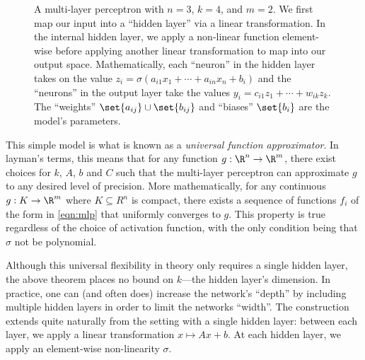 \begin{figure}
	\centering

	\caption{A multi-layer perceptron with $n = 3$, $k = 4$, and $m = 2$.  We first map our input into a ``hidden layer'' via a linear transformation. In the internal hidden layer, we apply a non-linear function element-wise before applying another linear transformation to map into our output space. Mathematically, each ``neuron'' in the hidden layer takes on the value $z_i = \sigma(a_{i1} x_1 + \cdots + a_{in} x_n + b_i)$ and the ``neurons'' in the output layer take the values $y_i = c_{i1} z_1 + \cdots + w_{ik} z_k$. The ``weights'' $\set{a_{ij}} \cup \set{b_{ij}}$ and ``biases'' $\set{b_i}$ are the model's parameters.}
	\label{fig:mlp-diagram}
\end{figure}

This simple model is what is known as a \emph{universal function approximator}. In layman's terms, this means that for any function $g : \R^n \to \R^m$, there exist choices for $k$, $A$, $b$ and $C$ such that the multi-layer perceptron can approximate $g$ to any desired level of precision. More mathematically, for any continuous $g : K \to \R^m$ where $K \subseteq R^n$ is compact, there exists a sequence of functions $f_i$ of the form in \autoref{eqn:mlp} that uniformly converges to $g$. This property is true regardless of the choice of activation function, with the only condition being that $\sigma$ not be polynomial.

Although this universal flexibility in theory only requires a single hidden layer, the above theorem places no bound on $k$---the hidden layer's dimension. In practice, one can (and often does) increase the network's ``depth'' by including multiple hidden layers in order to limit the networks ``width''. The construction extends quite naturally from the setting with a single hidden layer: between each layer, we apply a linear transformation $x \mapsto Ax + b$. At each hidden layer, we apply an element-wise non-linearity $\sigma$.

